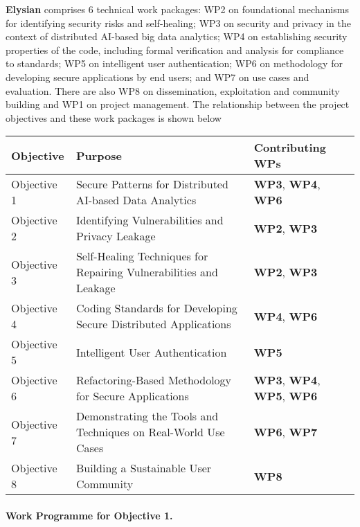 \documentclass[a4paper,11pt]{article}
\newcommand{\project}[1]{\textbf{#1}\xspace}
\newcommand{\SECURITY}{\project{Elysian}}
\newcommand{\TheProject}{\SECURITY}
\begin{document}
\TheProject{} comprises 6 technical work packages: WP2 on foundational mechanisms for identifying security risks and self-healing; WP3 on security and privacy in the context of distributed AI-based big data analytics; WP4 on establishing security properties of the code, including formal verification and analysis for compliance to standards;  WP5 on intelligent user authentication; WP6 on methodology for developing secure applications by end users; and WP7 on use cases and evaluation. There are also WP8 on dissemination, exploitation and community building and WP1 on project management. The relationship between the project objectives and these work packages is shown below

\vspace{-8pt}
\begin{center}
\begin{tabular}{|l|l|l|}\hline
\textbf{Objective} & \textbf{Purpose} & \textbf{Contributing WPs} \\\hline \hline
Objective 1 & Secure Patterns for Distributed AI-based Data Analytics & \textbf{WP3}, \textbf{WP4}, \textbf{WP6} \\\hline
Objective 2 & Identifying Vulnerabilities and Privacy Leakage & \textbf{WP2}, \textbf{WP3} \\\hline
Objective 3 & Self-Healing Techniques for Repairing Vulnerabilities and Leakage & \textbf{WP2}, \textbf{WP3} \\\hline
Objective 4 & Coding Standards for Developing Secure Distributed Applications & \textbf{WP4}, \textbf{WP6} \\\hline
Objective 5 & Intelligent User Authentication & \textbf{WP5} \\\hline
Objective 6 & Refactoring-Based Methodology for Secure Applications & \textbf{WP3}, \textbf{WP4}, \textbf{WP5}, \textbf{WP6} \\\hline
Objective 7 & Demonstrating the Tools and Techniques on Real-World Use Cases & \textbf{WP6}, \textbf{WP7}\\\hline
Objective 8 & Building a Sustainable User Community & \textbf{WP8}\\\hline
\end{tabular}
\end{center}

\paragraph*{Work Programme for Objective 1.}
\end{document}
